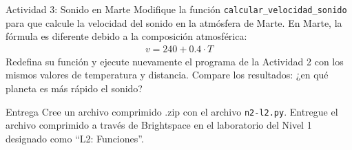 \documentclass{ip-lab}
\begin{document}
\begin{sectionbox}{Actividad 3: Sonido en Marte}
Modifique la función \texttt{calcular\_velocidad\_sonido} para que calcule la velocidad del sonido en la atmósfera de Marte. En Marte, la fórmula es diferente debido a la composición atmosférica:
\begin{gather*}
    v = 240 + 0.4 \cdot T
\end{gather*}
Redefina su función y ejecute nuevamente el programa de la Actividad 2 con los mismos valores de temperatura y distancia. Compare los resultados: ¿en qué planeta es más rápido el sonido?
\end{sectionbox}

\begin{sectionbox}{Entrega}
Cree un archivo comprimido .zip con el archivo \texttt{n2-l2.py}. Entregue el archivo comprimido a través de Brightspace en el laboratorio del Nivel 1 designado como ``L2: Funciones''.
\end{sectionbox}
\end{document}
